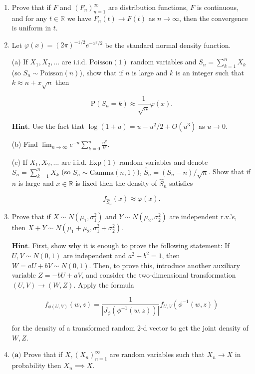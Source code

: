 \documentclass[11pt]{report}
\newcommand{\R}{\mathbb{R}}
\theoremstyle{plain}
\theoremstyle{definition}
\begin{document}
\begin{enumerate}[label=\arabic*.]
\noindent It follows in particular that, almost surely, the
random walk will cross the origin infinitely many
times.

\item Prove that if $F$ and $(F_n)_{n=1}^\infty$ are
distribution functions, $F$ is continuous, and for
any $t\in \R$ we have $F_n(t)\to F(t)$ as
$n\to\infty$, then the convergence is uniform in $t$.

\item Let $\varphi(x)=(2\pi)^{-1/2} e^{-x^2/2}$ be the
standard normal density function.

(a) If $X_1,X_2,\ldots$ are i.i.d.
$\textrm{Poisson}(1)$ random variables and
$S_n=\sum_{k=1}^n X_k$ (so
$S_n \sim \textrm{Poisson}(n)$), show that if $n$ is
large and $k$ is an integer such that
$k\approx n+x\sqrt{n}$ then

\[
\mathrm{P}(S_n=k) \approx \frac{1}{\sqrt{n}} \varphi(x).
\]

\noindent $\textbf{Hint.}$ Use the fact that
$\log(1+u)=u-u^2/2 + O(u^3)$ as $u\to 0$.

(b) Find
$\lim_{n\to\infty} e^{-n} \sum_{k=0}^n
\frac{n^k}{k!}$.

(c) If $X_1,X_2,\ldots$ are i.i.d. $\textrm{Exp}(1)$
random variables and denote $S_n=\sum_{k=1}^n X_k$
(so $S_n \sim \textrm{Gamma}(n,1)$),
$\hat{S}_n = (S_n-n)/\sqrt{n}$. Show that if $n$ is
large and $x\in \R$ is fixed then the density of
$\hat{S}_n$ satisfies

\[
f_{\hat{S}_n}(x) \approx \varphi(x).
\]

\item Prove that if $X\sim N(\mu_1, \sigma_1^2)$ and
$Y\sim N(\mu_2, \sigma_2^2)$ are independent r.v.'s,
then $X+Y \sim N(\mu_1+\mu_2, \sigma_1^2+\sigma_2^2)$.

$\textbf{Hint.}$ First, show why it is enough to
prove the following statement: If $U,V \sim N(0,1)$
are independent and $a^2+b^2 = 1$, then
$W=aU+bV \sim N(0,1)$. Then, to prove this, introduce
another auxiliary variable $Z=-bU+aV$, and consider
the two-dimensional transformation $(U,V)\to(W,Z)$.
Apply the formula

\[
f_{\phi(U,V)}(w,z) = \frac{1}{|J_\phi(\phi^{-1}(w,z))|} f_{U,V}(\phi^{-1}(w,z))
\]

\noindent for the density of a transformed random $2$-d vector
to get the joint density of $W,Z$.

\item $\textbf{(a)}$ Prove that if $X, (X_n)_{n=1}^\infty$
are random variables such that $X_n \to X$ in
probability then $X_n \implies X$.


\end{enumerate}
\end{document}
